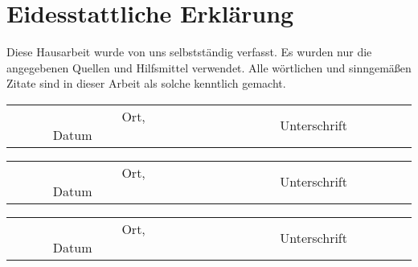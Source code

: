 \section*{Eidesstattliche Erklärung}
Diese Hausarbeit wurde von uns selbstständig verfasst. Es wurden nur die angegebenen Quellen und Hilfsmittel verwendet. Alle wörtlichen und sinngemäßen Zitate sind in dieser Arbeit als solche kenntlich gemacht.\\

\vspace{3cm}
\begin{tabular*}{\textwidth}{c@{\extracolsep\fill}cc}
	\cline{1-1}
	\cline{3-3}
	\\
	\ \ \ \ \ \ \ \ \ Ort, Datum\ \ \ \ \ \ \ \ \ \ & & \ \ \ \ \ \ \ \ \ Unterschrift\ \ \ \ \ \ \ \ \ \\
\end{tabular*}

\vspace{3cm}
\begin{tabular*}{\textwidth}{c@{\extracolsep\fill}cc}
	\cline{1-1}
	\cline{3-3}
	\\
	\ \ \ \ \ \ \ \ \ Ort, Datum\ \ \ \ \ \ \ \ \ \ & & \ \ \ \ \ \ \ \ \ Unterschrift\ \ \ \ \ \ \ \ \ \\
\end{tabular*}

\vspace{3cm}
\begin{tabular*}{\textwidth}{c@{\extracolsep\fill}cc}
	\cline{1-1}
	\cline{3-3}
	\\
	\ \ \ \ \ \ \ \ \ Ort, Datum\ \ \ \ \ \ \ \ \ \ & & \ \ \ \ \ \ \ \ \ Unterschrift\ \ \ \ \ \ \ \ \ \\
\end{tabular*}